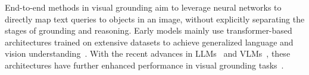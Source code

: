 End-to-end methods in visual grounding aim to leverage neural networks to directly map text queries to objects in an image, without explicitly separating the stages of grounding and reasoning.
Early models mainly use transformer-based architectures trained on extensive datasets to achieve generalized language and vision understanding~\cite{heigold_video_2023, minderer_scaling_2023, li_grounded_2022, liu_grounding_2023, cheng_yolo-world_2024}.  With the recent advances in LLMs~\cite{openai_gpt-4o_2024, dubeyLlama2024, brown_language_2020} and VLMs~\cite{li_otter_2023, alayrac_flamingo_2022, dai_instructblip_2023, wang_visionllm_2023, wu_next-gpt_2023, liu_visual_2023, chen_minigpt-v2_2023}, these architectures have further enhanced performance in visual grounding tasks~\cite{peng_kosmos-2_2023, lai_lisa_2024, rasheed_glamm_2024, pi_perceptiongpt_2024, xia_gsva_2024}.

